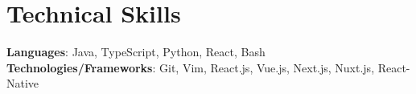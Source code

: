 \section{Technical Skills}
\begin{itemize}[leftmargin=0.15in, label={}]
	\small{\item{
	      \textbf{Languages}{: Java, TypeScript, Python, React, Bash } \\
	      \textbf{Technologies/Frameworks}{: Git, Vim, React.js, Vue.js, Next.js, Nuxt.js, React-Native}}} \\
\end{itemize}

